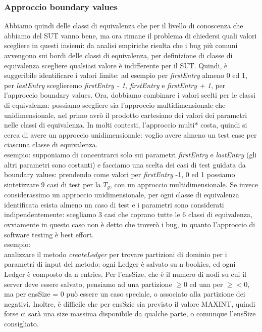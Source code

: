 \documentclass{article}
\begin{document}
\subsubsection{Approccio boundary values}
Abbiamo quindi delle classi di equivalenza che per il livello di conoscenza che abbiamo del SUT vanno bene, ma ora rimane il problema di chiedersi quali valori scegliere in questi insiemi: da analisi empiriche risulta che i bug più comuni avvengono sui bordi delle classi di equivalenza, per definizione di classe di equivalenza scegliere qualsiasi valore è indifferente per il SUT. Quindi, è suggeribile identificare i valori limite: ad esempio per \textit{firstEntry} almeno 0 ed 1, per \textit{lastEntry} sceglieremo \textit{firstEntry - 1}, \textit{firstEntry} e \textit{firstEntry + 1}, per l'approccio boundary values. Ora, dobbiamo combinare i valori scelti per le classi di equivalenza: possiamo scegliere sia l'approccio multidimensionale che unidimensionale, nel primo avrò il prodotto cartesiano dei valori dei parametri nelle classi di equivalenza. In molti contesti, l'approccio multi* costa, quindi si cerca di avere un approccio unidimensionale: voglio avere almeno un test case per ciascuna classe di equivalenza.\\esempio: supponiamo di concentrarci solo sui parametri \textit{firstEntry} e \textit{lastEntry} (gli altri parametri sono costanti) e facciamo una scelta dei casi di test guidata da boundary values: prendendo come valori per \textit{firstEntry} -1, 0 ed 1 possiamo sintetizzare 9 casi di test per la $T_g$, con un approccio multidimensionale. Se invece considerassimo un approccio unidimensionale, per ogni classe di equivalenza identificata esista almeno un caso di test e i parametri sono considerati indipendentemente: scegliamo 3 casi che coprano tutte le 6 classi di equivalenza, ovviamente in questo caso non è detto che troverò i bug, in quanto l'approccio di software testing è best effort.\\
esempio:\\ analizzare il metodo \textit{createLedger} per trovare partizioni di dominio per i parametri di input del metodo: ogni Ledger è salvato su n bookies, ed ogni Ledger è composto da n entries. Per l'ensSize, che è il numero di nodi su cui il server deve essere salvato, pensiamo ad una partizione $\geq 0$ ed una per $\geq < 0$, ma per ensSize = 0 può essere un caso speciale, o associato alla partizione dei negativi. Inoltre, è difficile che per ensSzie sia previsto il valore MAXINT, quindi forse ci sarà una size massima disponibile da qualche parte, o comunque l'ensSize consigliato.
\end{document}
